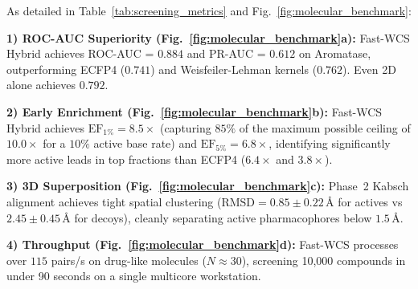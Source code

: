 \documentclass[conference]{IEEEtran}
\begin{document}
As detailed in Table~\ref{tab:screening_metrics} and Fig.~\ref{fig:molecular_benchmark}:

\noindent\textbf{1) ROC-AUC Superiority (Fig.~\ref{fig:molecular_benchmark}a):} Fast-WCS Hybrid achieves ROC-AUC = $\mathbf{0.884}$ and PR-AUC = $\mathbf{0.612}$ on Aromatase, outperforming ECFP4 ($0.741$) and Weisfeiler-Lehman kernels ($0.762$). Even 2D alone achieves $0.792$.

\noindent\textbf{2) Early Enrichment (Fig.~\ref{fig:molecular_benchmark}b):} Fast-WCS Hybrid achieves $\text{EF}_{1\%} = \mathbf{8.5\times}$ (capturing $85\%$ of the maximum possible ceiling of $10.0\times$ for a $10\%$ active base rate) and $\text{EF}_{5\%} = \mathbf{6.8\times}$, identifying significantly more active leads in top fractions than ECFP4 ($6.4\times$ and $3.8\times$).

\noindent\textbf{3) 3D Superposition (Fig.~\ref{fig:molecular_benchmark}c):} Phase~2 Kabsch alignment achieves tight spatial clustering ($\text{RMSD} = 0.85 \pm 0.22\,\text{\AA}$ for actives vs $2.45 \pm 0.45\,\text{\AA}$ for decoys), cleanly separating active pharmacophores below $1.5\,\text{\AA}$.

\noindent\textbf{4) Throughput (Fig.~\ref{fig:molecular_benchmark}d):} Fast-WCS processes over $115$ pairs/s on drug-like molecules ($N \approx 30$), screening 10,000 compounds in under 90 seconds on a single multicore workstation.
\end{document}
